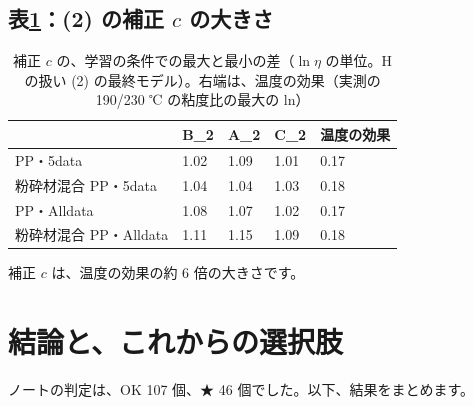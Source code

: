 \documentclass[paper=a4paper,fontsize=10.5pt,line_length=44zw,number_of_lines=38]{jlreq}
\begin{document}
\subsection{表\ref{tab:dec}：(2) の補正 $c$ の大きさ}
\begin{table}[H]
\caption{補正 $c$ の、学習の条件での最大と最小の差（$\ln\eta$ の単位。H の扱い (2) の最終モデル）。右端は、温度の効果（実測の 190/230 ℃ の粘度比の最大の ln）}\label{tab:dec}
\small
\begin{tabularx}{\linewidth}{@{}lXXXX@{}}
\toprule
 & B\_2 & A\_2 & C\_2 & 温度の効果 \\
\midrule
PP・5data & 1.02 & 1.09 & 1.01 & 0.17 \\
粉砕材混合 PP・5data & 1.04 & 1.04 & 1.03 & 0.18 \\
PP・Alldata & 1.08 & 1.07 & 1.02 & 0.17 \\
粉砕材混合 PP・Alldata & 1.11 & 1.15 & 1.09 & 0.18 \\
\bottomrule
\end{tabularx}
\end{table}
補正 $c$ は、温度の効果の約 6 倍の大きさです。


\section{結論と、これからの選択肢}


ノートの判定は、OK 107 個、★ 46 個でした。以下、結果をまとめます。
\end{document}
